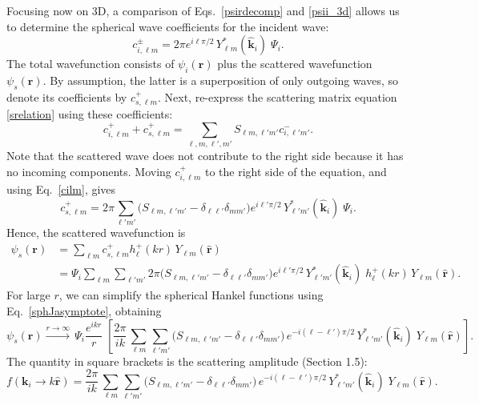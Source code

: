 \documentclass[pra,12pt]{revtex4-2}
\begin{document}
Focusing now on 3D, a comparison of Eqs.~\eqref{psirdecomp} and
\eqref{psii_3d} allows us to determine the spherical wave coefficients
for the incident wave:
\begin{equation}
  c^{\pm}_{i, \ell m} = 2 \pi e^{i\ell\pi/2} \,
  Y_{\ell m}^*(\hat{\mathbf{k}}_i)\; \Psi_i.
  \label{cilm}
\end{equation}
The total wavefunction consists of $\psi_i(\mathbf{r})$ plus the
scattered wavefunction $\psi_s(\mathbf{r})$.  By assumption, the
latter is a superposition of only outgoing waves, so denote its
coefficients by $c^+_{s,\ell m}$.  Next, re-express the scattering
matrix equation \eqref{srelation} using these coefficients:
\begin{equation}
  c^+_{i,\ell m} + c^+_{s,\ell m}
  = \sum_{\ell, m, \ell', m'} S_{\ell m, \ell'm'} c^-_{i,\ell'm'}.
\end{equation}
Note that the scattered wave does not contribute to the right side
because it has no incoming components.  Moving $c_{i,\ell m}^+$ to the
right side of the equation, and using Eq.~\eqref{cilm}, gives
\begin{equation}
  c^+_{s,\ell m} = 2 \pi \sum_{\ell' m'} \Big(S_{\ell m, \ell' m'}
  - \delta_{\ell \ell'}\delta_{mm'}\Big) e^{i\ell'\pi/2} \,
  Y_{\ell' m'}^*(\hat{\mathbf{k}}_i)\; \Psi_i.
\end{equation}
Hence, the scattered wavefunction is
\begin{equation}
  \begin{aligned}\psi_s(\mathbf{r}) &= \sum_{\ell m} c^+_{s,\ell m} h_{\ell}^+(kr) \, Y_{\ell m}(\hat{\mathbf{r}}) \\ &= \Psi_i \sum_{\ell m} \sum_{\ell' m'} 2 \pi \Big(S_{\ell m, \ell' m'} - \delta_{\ell \ell'}\delta_{mm'}\Big) e^{i\ell'\pi/2} \, Y_{\ell' m'}^*(\hat{\mathbf{k}}_i)\; h_{\ell}^+(kr) \, Y_{\ell m}(\hat{\mathbf{r}}).\end{aligned}
\end{equation}
For large $r$, we can simplify the spherical Hankel functions using
Eq.~\eqref{sphJasymptote}, obtaining
\begin{equation}
  \psi_s(\mathbf{r}) \overset{r\rightarrow\infty}{\longrightarrow} \, \Psi_i \frac{e^{ikr}}{r} \; \left[ \frac{2 \pi}{ik}\, \sum_{\ell m} \sum_{\ell' m'} \Big(S_{\ell m, \ell' m'} - \delta_{\ell \ell'}\delta_{mm'}\Big) \, e^{-i(\ell-\ell')\pi/2} \, Y_{\ell' m'}^*(\hat{\mathbf{k}}_i)\; Y_{\ell m}(\hat{\mathbf{r}})\right].
\end{equation}
The quantity in square brackets is the scattering amplitude (Section
1.5):
\begin{equation}
  f(\mathbf{k}_i \rightarrow k\hat{\mathbf{r}}) =  \frac{2 \pi}{ik}\, \sum_{\ell m} \sum_{\ell' m'} \Big(S_{\ell m, \ell' m'} - \delta_{\ell \ell'}\delta_{mm'}\Big) \, e^{-i(\ell-\ell')\pi/2} \, Y_{\ell' m'}^*(\hat{\mathbf{k}}_i)\; Y_{\ell m}(\hat{\mathbf{r}}).
  \label{3dfrelation}
\end{equation}
\end{document}
